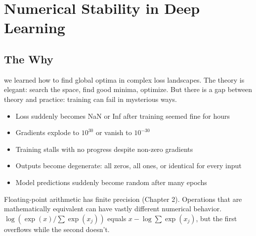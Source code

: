 \chapter{Numerical Stability in Deep Learning}



\section{The Why}

 we learned how to find global optima in complex loss landscapes.
The theory is elegant: search the space, find good minima, optimize.
But there is a gap between theory and practice: training can fail in mysterious ways.

\begin{itemize}
    \item Loss suddenly becomes NaN or Inf after training seemed fine for hours
    \item Gradients explode to $10^{30}$ or vanish to $10^{-30}$
    \item Training stalls with no progress despite non-zero gradients
    \item Outputs become degenerate: all zeros, all ones, or identical for every input
    \item Model predictions suddenly become random after many epochs
\end{itemize}


 Floating-point arithmetic has finite precision (Chapter 2). Operations that are mathematically equivalent can have vastly different numerical behavior. $\log(\exp(x)/\sum\exp(x_j))$ equals $x - \log\sum\exp(x_j)$, but the first overflows while the second doesn't.

